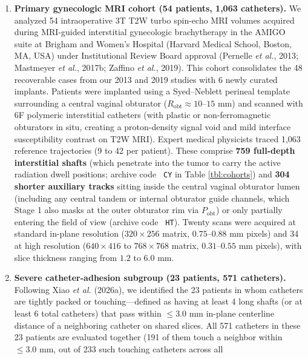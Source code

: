 \documentclass[
  11pt,
]{article}
\providecommand{\tightlist}{%
  \setlength{\itemsep}{0pt}\setlength{\parskip}{0pt}}
\let\nforigtexttt\texttt
\renewcommand{\texttt}[1]{\nforigtexttt{\XeTeXinterchartokenstate=1 #1}}
\begin{document}
\begin{enumerate}
\def\labelenumi{\arabic{enumi}.}
\tightlist
\item
  \textbf{Primary gynecologic MRI cohort (54 patients, 1,063
  catheters).} We analyzed 54 intraoperative 3T T2W turbo spin-echo MRI
  volumes acquired during MRI-guided interstitial gynecologic
  brachytherapy in the AMIGO suite at Brigham and Women's Hospital
  (Harvard Medical School, Boston, MA, USA) under Institutional Review
  Board approval (Pernelle \emph{et al.}, 2013; Mastmeyer \emph{et al.},
  2017b; Zaffino \emph{et al.}, 2019). This cohort consolidates the 48
  recoverable cases from our 2013 and 2019 studies with 6 newly curated
  implants. Patients were implanted using a Syed--Neblett perineal
  template surrounding a central vaginal obturator
  (\(R_{\text{obt}} \approx 10\text{--}15\text{ mm}\)) and scanned with
  6F polymeric interstitial catheters (with plastic or non-ferromagnetic
  obturators in situ, creating a proton-density signal void and mild
  interface susceptibility contrast on T2W MRI). Expert medical
  physicists traced 1,063 reference trajectories (9 to 42 per patient).
  These comprise \textbf{759 full-depth interstitial shafts} (which
  penetrate into the tumor to carry the active radiation dwell
  positions; archive code \texttt{CY} in Table \ref{tbl:cohorts}) and
  \textbf{304 shorter auxiliary tracks} sitting inside the central
  vaginal obturator lumen (including any central tandem or internal
  obturator guide channels, which Stage 1 also masks at the outer
  obturator rim via \(P_{\text{obt}}\)) or only partially entering the
  field of view (archive code \texttt{HT}). Twenty scans were acquired
  at standard in-plane resolution (\(320 \times 256\) matrix,
  \(0.75\text{--}0.88\text{ mm}\) pixels) and 34 at high resolution
  (\(640 \times 416\) to \(768 \times 768\) matrix,
  \(0.31\text{--}0.55\text{ mm}\) pixels), with slice thickness ranging
  from \(1.2\text{ to }6.0\text{ mm}\).
\item
  \textbf{Severe catheter-adhesion subgroup (23 patients, 571
  catheters).} Following Xiao \emph{et al.} (2026a), we identified the
  23 patients in whom catheters are tightly packed or touching---defined
  as having at least 4 long shafts (or at least 6 total catheters) that
  pass within \(\le 3.0\text{ mm}\) in-plane centerline distance of a
  neighboring catheter on shared slices. All 571 catheters in these 23
  patients are evaluated together (191 of them touch a neighbor within
  \(\le 3.0\text{ mm}\), out of 233 such touching catheters across all

\end{enumerate}
\end{document}
